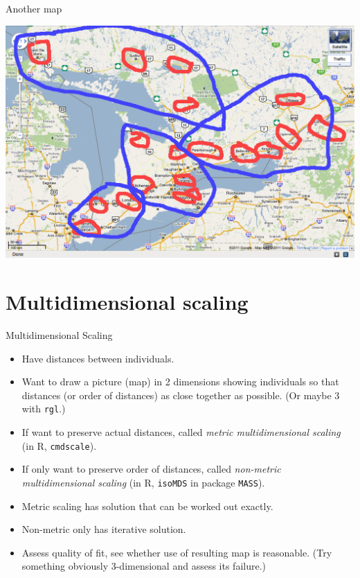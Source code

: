 \documentclass[ignorenonframetext,]{beamer}
\begin{document}
\begin{frame}{Another map}
\protect\hypertarget{another-map}{}

\includegraphics{map2.png}

\end{frame}

\hypertarget{multidimensional-scaling}{%
\section{Multidimensional scaling}\label{multidimensional-scaling}}

\begin{frame}[fragile]{Multidimensional Scaling}
\protect\hypertarget{multidimensional-scaling-1}{}

\begin{itemize}
\item
  Have distances between individuals.
\item
  Want to draw a picture (map) in 2 dimensions showing individuals so
  that distances (or order of distances) as close together as possible.
  (Or maybe 3 with \texttt{rgl}.)
\item
  If want to preserve actual distances, called \emph{metric
  multidimensional scaling} (in R, \texttt{cmdscale}).
\item
  If only want to preserve order of distances, called \emph{non-metric
  multidimensional scaling} (in R, \texttt{isoMDS} in package
  \texttt{MASS}).
\item
  Metric scaling has solution that can be worked out exactly.
\item
  Non-metric only has iterative solution.
\item
  Assess quality of fit, see whether use of resulting map is reasonable.
  (Try something obviously 3-dimensional and assess its failure.)
\end{itemize}

\end{frame}
\end{document}
